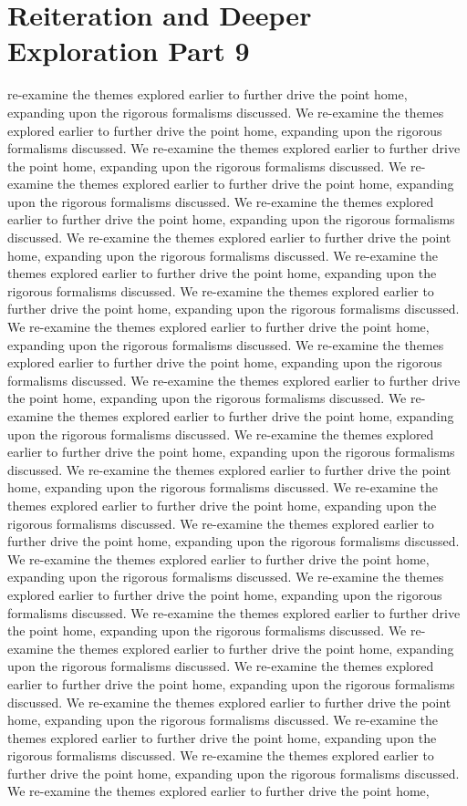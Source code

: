 \section{Reiteration and Deeper Exploration Part 9}\nWe re-examine the themes explored earlier to further drive the point home, expanding upon the rigorous formalisms discussed. We re-examine the themes explored earlier to further drive the point home, expanding upon the rigorous formalisms discussed. We re-examine the themes explored earlier to further drive the point home, expanding upon the rigorous formalisms discussed. We re-examine the themes explored earlier to further drive the point home, expanding upon the rigorous formalisms discussed. We re-examine the themes explored earlier to further drive the point home, expanding upon the rigorous formalisms discussed. We re-examine the themes explored earlier to further drive the point home, expanding upon the rigorous formalisms discussed. We re-examine the themes explored earlier to further drive the point home, expanding upon the rigorous formalisms discussed. We re-examine the themes explored earlier to further drive the point home, expanding upon the rigorous formalisms discussed. We re-examine the themes explored earlier to further drive the point home, expanding upon the rigorous formalisms discussed. We re-examine the themes explored earlier to further drive the point home, expanding upon the rigorous formalisms discussed. We re-examine the themes explored earlier to further drive the point home, expanding upon the rigorous formalisms discussed. We re-examine the themes explored earlier to further drive the point home, expanding upon the rigorous formalisms discussed. We re-examine the themes explored earlier to further drive the point home, expanding upon the rigorous formalisms discussed. We re-examine the themes explored earlier to further drive the point home, expanding upon the rigorous formalisms discussed. We re-examine the themes explored earlier to further drive the point home, expanding upon the rigorous formalisms discussed. We re-examine the themes explored earlier to further drive the point home, expanding upon the rigorous formalisms discussed. We re-examine the themes explored earlier to further drive the point home, expanding upon the rigorous formalisms discussed. We re-examine the themes explored earlier to further drive the point home, expanding upon the rigorous formalisms discussed. We re-examine the themes explored earlier to further drive the point home, expanding upon the rigorous formalisms discussed. We re-examine the themes explored earlier to further drive the point home, expanding upon the rigorous formalisms discussed. We re-examine the themes explored earlier to further drive the point home, expanding upon the rigorous formalisms discussed. We re-examine the themes explored earlier to further drive the point home, expanding upon the rigorous formalisms discussed. We re-examine the themes explored earlier to further drive the point home, expanding upon the rigorous formalisms discussed. We re-examine the themes explored earlier to further drive the point home, expanding upon the rigorous formalisms discussed. We re-examine the themes explored earlier to further drive the point home, 